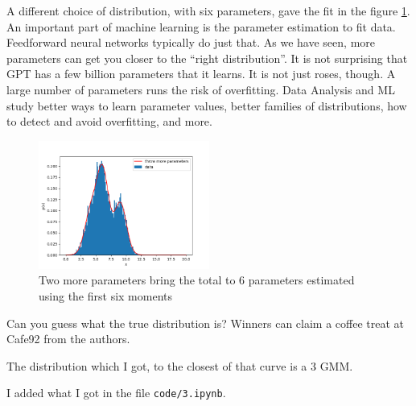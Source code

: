 \begin{tcolorbox}[title=]
    A different choice of distribution, with six parameters, gave the fit in the
    figure \ref{fig_q3f2}. An important part of machine learning is the parameter
    estimation to fit data. Feedforward neural networks typically do just that. As
    we have seen, more parameters can get you closer to the \enquote{right
    distribution}. It is not surprising that GPT has a few billion parameters that
    it learns. It is not just roses, though. A large number of parameters runs the
    risk of overfitting. Data Analysis and ML study better ways to learn parameter
    values, better families of distributions, how to detect and avoid overfitting,
    and more.

    \begin{figure}[H]
        \centering
        \includegraphics[width=0.5\textwidth]{assets/images/q3f2.png}
        \caption{Two more parameters bring the total to 6 parameters estimated
        using the first six moments}
        \label{fig_q3f2}
    \end{figure}
\end{tcolorbox}
    
\begin{tcolorbox}[title=Ungraded Bonus.]
    Can you guess what the true distribution is? Winners can claim a coffee treat
    at Cafe92 from the authors.
\end{tcolorbox}


The distribution which I got, to the closest of that curve is a 3 GMM.

I added what I got in the file \texttt{code/3.ipynb}.
